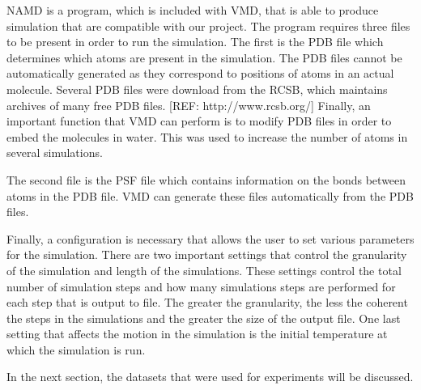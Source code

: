 \documentclass[a4paper,11pt]{report}
\begin{document}
NAMD is a program, which is included with VMD, that is able to produce simulation that are compatible with our project. The program requires three files to be present in order to run the simulation. The first is the PDB file which determines which atoms are present in the simulation. The PDB files cannot be automatically generated as they correspond to positions of atoms in an actual molecule. Several PDB files were download from the RCSB, which maintains archives of many free PDB files. [REF: http://www.rcsb.org/] Finally, an important function that VMD can perform is to modify PDB files in order to embed the molecules in water. This was used to increase the number of atoms in several simulations.

The second file is the PSF file which contains information on the bonds between atoms in the PDB file. VMD can generate these files automatically from the PDB files. 

Finally, a configuration is necessary that allows the user to set various parameters for the simulation. There are two important settings that control the granularity of the simulation and length of the simulations. These settings control the total number of simulation steps and how many simulations steps are performed for each step that is output to file. The greater the granularity, the less the coherent the steps in the simulations and the greater the size of the output file. One last setting that affects the motion in the simulation is the initial temperature at which the simulation is run.

In the next section, the datasets that were used for experiments will be discussed.
\end{document}
